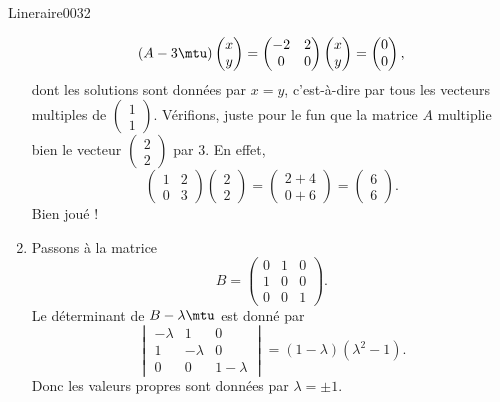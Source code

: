\begin{corrige}{Lineraire0032}
\begin{enumerate}
\begin{equation}
		(A-3\mtu)\begin{pmatrix}
			x	\\ 
			y	
		\end{pmatrix}=\begin{pmatrix}
			-2	&	2	\\ 
			0	&	0	
		\end{pmatrix}\begin{pmatrix}
			x	\\ 
			y	
		\end{pmatrix}=\begin{pmatrix}
			0	\\ 
			0	
		\end{pmatrix},
	\end{equation}
	dont les solutions sont données par $x=y$, c'est-à-dire par tous les vecteurs multiples de $\begin{pmatrix}
		1	\\ 
		1	
	\end{pmatrix}$. Vérifions, juste pour le fun que la matrice $A$ multiplie bien le vecteur $\begin{pmatrix}
		2	\\ 
		2	
	\end{pmatrix}$ par $3$. En effet,
	\begin{equation}
		\begin{pmatrix}
			1	&	2	\\ 
			0	&	3	
		\end{pmatrix}\begin{pmatrix}
			2	\\ 
			2	
		\end{pmatrix}=\begin{pmatrix}
			2+4	\\ 
			0+6	
		\end{pmatrix}=\begin{pmatrix}
			6	\\ 
			6	
		\end{pmatrix}.
	\end{equation}
	Bien joué !
\item
	Passons à la matrice
	\begin{equation}
		B=\begin{pmatrix}
			0	&	1	&	0	\\
			1	&	0	&	0	\\
			0	&	0	&	1
		\end{pmatrix}.
	\end{equation}
	Le déterminant de $B-\lambda\mtu$ est donné par
	\begin{equation}
		\begin{vmatrix}
			-\lambda	&	1	&	0	\\
			1	&	-\lambda	&	0	\\
			0	&	0	&	1-\lambda
		\end{vmatrix}=(1-\lambda)(\lambda^2-1).
	\end{equation}
	Donc les valeurs propres sont données par $\lambda=\pm 1$.


\end{enumerate}
\end{corrige}
